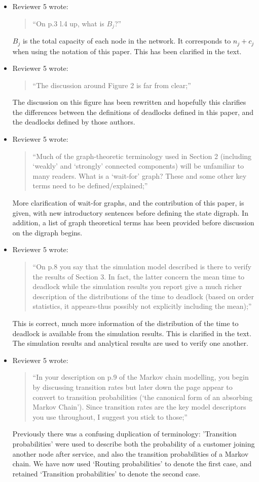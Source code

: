 \documentclass{article}
\begin{document}
\begin{itemize}
\item Reviewer 5 wrote:
\begin{quote}
``On p.3 l.4 up, what is $B_j$?''
\end{quote}
$B_j$ is the total capacity of each node in the network.
It corresponds to $n_j + c_j$ when using the notation of this paper.
This has been clarified in the text.

\item Reviewer 5 wrote:
\begin{quote}
``The discussion around Figure 2 is far from clear;''
\end{quote}
The discussion on this figure has been rewritten and hopefully this clarifies
the differences between the definitions of deadlocks defined in this paper,
and the deadlocks defined by those authors.

\item Reviewer 5 wrote:
\begin{quote}
``Much of the graph-theoretic terminology used in Section 2 (including
‘weakly’ and ‘strongly’ connected components) will be unfamiliar to many
readers.
What is a ‘wait-for’ graph? These and some other key terms need to be
defined/explained;''
\end{quote}
More clarification of wait-for graphs, and the contribution of this paper,
is given, with new introductory sentences before defining the state digraph.
In addition, a list of graph theoretical terms has been provided before
discussion on the digraph begins.

\item Reviewer 5 wrote:
\begin{quote}
``On p.8 you say that the simulation model described is there to verify the
results of Section 3.
In fact, the latter concern the mean time to deadlock while the simulation
results you report give a much richer description of the distributions of the
time to deadlock (based on order statistics, it appears-thus possibly not
explicitly including the mean);''
\end{quote}
This is correct, much more information of the distribution of the time to
deadlock is available from the simulation results.
This is clarified in the text.
The simulation results and analytical results are used to verify one another.

\item Reviewer 5 wrote:
\begin{quote}
``In your description on p.9 of the Markov chain modelling, you begin by
discussing transition rates but later down the page appear to convert to
transition probabilities (‘the canonical form of an absorbing Markov Chain’).
Since transition rates are the key model descriptors you use throughout,
I suggest you stick to those;''
\end{quote}
Previously there was a confusing duplication of terminology: 'Transition
probabilities' were used to describe both the probability of a customer joining
another node after service, and also the transition probabilities of a Markov
chain.
We have now used `Routing probabilities' to denote the first case, and retained
`Transition probabilities' to denote the second case.



\end{itemize}
\end{document}

